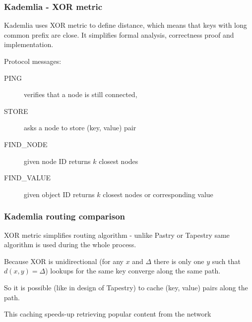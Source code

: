 \documentclass{beamer}
\begin{document}
\begin{frame}
\frametitle{Kademlia - XOR metric}

\begin{block}{}
Kademlia uses XOR metric to define distance, which means that keys with long common prefix are close. It simplifies formal analysis,
correctness proof and implementation.
\end{block}

\pause

\begin{block}{}
Protocol messages:
\begin{description}
\item[PING] verifies that a node is still connected,
\item[STORE] asks a node to store (key, value) pair
\item[FIND\_NODE] given node ID returns $k$ closest nodes
\item[FIND\_VALUE] given object ID returns $k$ closest nodes or corresponding value
\end{description}
\end{block}

\end{frame}

\begin{frame}
\frametitle{Kademlia routing comparison}

\begin{block}{}
XOR metric simplifies routing algorithm - unlike Pastry or Tapestry same algorithm is used during the whole process.
\end{block}

\pause

\begin{block}{}
Because XOR is unidirectional (for any $x$ and $\Delta$ there is only one $y$ such that $d(x, y) = \Delta$) lookups for
the same key converge along the same path. 

So it is possible (like in design of Tapestry) to cache (key, value) pairs along the path. 
\end{block}

\pause

\begin{block}{}
This caching speeds-up retrieving popular content from the network
\end{block}

\end{frame}
\end{document}
